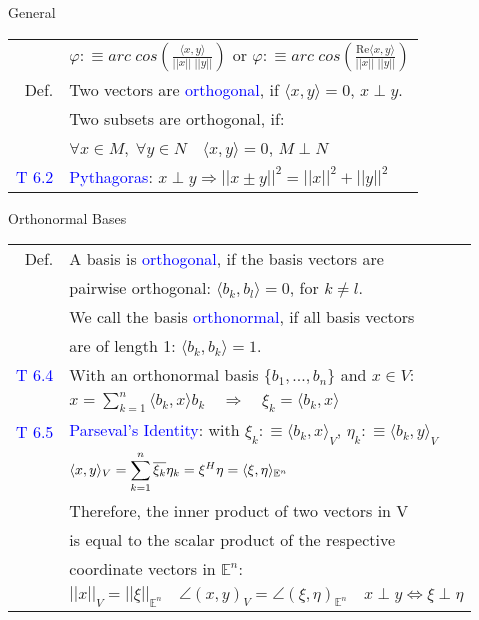 \begin{mainbox}{General}
\begin{tabular}{rll}
	& \multicolumn{2}{l}{$\varphi :\equiv arc\;cos\left(\frac{\langle x,y\rangle}{||x||\;||y||}\right)$ or $\varphi :\equiv arc\;cos\left(\frac{\text{Re}\langle x,y\rangle}{||x||\;||y||}\right)$ }\\
	\rule{0pt}{3ex}
	Def. & \multicolumn{2}{l}{Two vectors are \textcolor{blue}{orthogonal}, if $\langle x,y\rangle = 0$, $x \perp y$.}\\
	& \multicolumn{2}{l}{Two subsets are orthogonal, if:}\\
	& \multicolumn{2}{l}{$\forall x\in M,\;\forall y\in N\quad\langle x,y\rangle = 0$, $M \perp N$}\\
	\rule{0pt}{3ex}
	\textcolor{blue}{T 6.2} & \multicolumn{2}{l}{\textcolor{blue}{Pythagoras}: $x\perp y \Rightarrow ||x\pm y||^2 = ||x||^2 + ||y||^2$}\\
\end{tabular}
\end{mainbox}

\begin{mainbox}{Orthonormal Bases}
\setlength{\tabcolsep}{2pt}
\begin{tabular}{rl}
	Def. & A basis is \textcolor{blue}{orthogonal}, if the basis vectors are\\
	& pairwise orthogonal: $\langle b_k,b_l\rangle = 0$, for $k \neq l$.\\
	& We call the basis \textcolor{blue}{orthonormal}, if all basis vectors\\
	& are of length 1: $\langle b_k, b_k\rangle = 1$.\\
	\rule{0pt}{3ex}
	\textcolor{blue}{T 6.4} & With an orthonormal basis $\{b_1, ..., b_n\}$ and $x\in V$:\\
	& $x = \displaystyle\sum_{k=1}^n\langle b_k, x\rangle b_k\quad\Rightarrow\quad\xi_k = \langle b_k, x\rangle$\\
	\rule{0pt}{3ex}
	\textcolor{blue}{T 6.5} & \textcolor{blue}{Parseval's Identity}: with $\xi_k :\equiv \langle b_k,x\rangle_V$, $\eta_k :\equiv \langle b_k, y\rangle_V$\\
	& $\langle x, y\rangle_V = \displaystyle\sum_{k=1}^n\overline{\xi_k}\eta_k = \xi^H\eta = \langle\xi, \eta\rangle_{\mathbb{E}^n}$\\
	& Therefore, the inner product of two vectors in V\\
	& is equal to the scalar product of the respective\\
	& coordinate vectors in $\mathbb{E}^n$:\\
	& $||x||_V = ||\xi||_{\mathbb{E}^n}\quad\angle(x,y)_V = \angle(\xi,\eta)_{\mathbb{E}^n}\quad x\perp y \Leftrightarrow \xi\perp\eta$\\
\end{tabular}
\end{mainbox}


